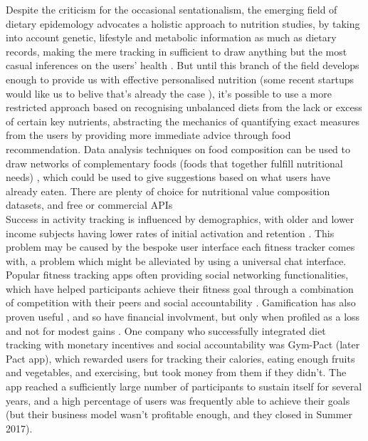 Despite the criticism for the occasional sentationalism, the emerging field of dietary epidemology advocates a holistic approach to nutrition studies, by taking into account genetic, lifestyle and metabolic information as much as dietary records, making the mere tracking in sufficient to draw anything but the most casual inferences on the users' health \cite{byers2001food}. But until this branch of the field develops enough to provide us with effective personalised nutrition (some recent startups would like us to belive that's already the case \cite{habitwebsite}), it's possible to use a more restricted approach based on recognising unbalanced diets from the lack or excess of certain key nutrients, abstracting the mechanics of quantifying exact measures from the users by providing more immediate advice through food recommendation. Data analysis techniques on food composition can be used to draw networks of complementary foods (foods that together fulfill nutritional needs) \cite{Kim2015a}, which could be used to give suggestions based on what users have already eaten. There are plenty of choice for nutritional value composition datasets\cite{}, and free or commercial APIs \cite{}\\
Success in activity tracking is influenced by demographics, with older and lower income subjects having lower rates of initial activation and retention \cite{Patel2017}. This problem may be caused by the bespoke user interface each fitness tracker comes with, a problem which might be alleviated by using a universal chat interface.\\
Popular fitness tracking apps often providing social networking functionalities, which have helped participants achieve their fitness goal through a combination of competition with their peers and social accountability \cite{chenchen2014}. Gamification has also proven useful \cite{doi:10.1001/jamainternmed.2017.3458}, and so have financial involvment, but only when profiled as a loss and not for modest gains \cite{doi:10.7326/M15-1635}. One company who successfully integrated diet tracking with monetary incentives and social accountability was Gym-Pact (later Pact app), which rewarded users for tracking their calories, eating enough fruits and vegetables, and exercising, but took money from them if they didn't. The app reached a sufficiently large number of participants \cite{nudgingpracticioner} to sustain itself for several years, and a high percentage of users was frequently able to achieve their goals (but their business model wasn't profitable enough, and they closed in Summer 2017).
